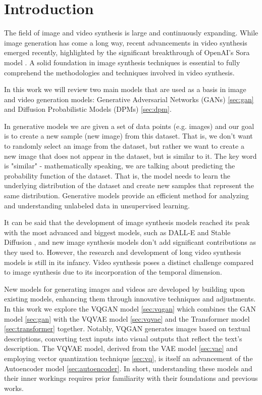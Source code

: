 \section{Introduction}

The field of image and video synthesis is large and continuously expanding. While image generation has come a long way, recent advancements in video synthesis emerged recently, highlighted by the significant breakthrough of OpenAI's Sora model \cite{sora_website}. A solid foundation in image synthesis techniques is essential to fully comprehend the methodologies and techniques involved in video synthesis.

In this work we will review two main models that are used as a basis in image and video generation models: Generative Adversarial Networks (GANs) \cite{gan} \ref{sec:gan} and Diffusion Probabilistic Models (DPMs) \cite{diffusion_models} \cite{ddpm} \ref{sec:dpm}.

In generative models we are given a set of data points (e.g. images) and our goal is to create a new sample (new image) from this dataset. That is, we don't want to randomly select an image from the dataset, but rather we want to create a new image that does not appear in the dataset, but is similar to it. The key word is "similar" - mathematically speaking, we are talking about predicting the probability function of the dataset. That is, the model needs to learn the underlying distribution of the dataset and create new samples that represent the same distribution. Generative models provide an efficient method for analyzing and understanding unlabeled data in unsupervised learning.

It can be said that the development of image synthesis models reached its peak with the most advanced and biggest models, such as DALL-E \cite{dalle} and Stable Diffusion \cite{stable_diffusion}, and new image synthesis models don't add significant contributions as they used to. However, the research and development of long video synthesis models is still in its infancy. Video synthesis poses a distinct challenge compared to image synthesis due to its incorporation of the temporal dimension.

New models for generating images and videos are developed by building upon existing models, enhancing them through innovative techniques and adjustments. In this work we explore the VQGAN model \cite{vqgan} \ref{sec:vqgan} which combines the GAN model \cite{gan} \ref{sec:gan} with the VQVAE model \cite{vqvae} \ref{sec:vqvae} and the Transformer model \cite{transformer} \ref{sec:transformer} together. Notably, VQGAN generates images based on textual descriptions, converting text inputs into visual outputs that reflect the text's description. The VQVAE model, derived from the VAE model \cite{vae} \ref{sec:vae} and employing vector quantization technique \cite{vq} \ref{sec:vq}, is itself an advancement of the Autoencoder model \cite{autoencoder} \ref{sec:autoencoder}. In short, understanding these models and their inner workings requires prior familiarity with their foundations and previous works.

